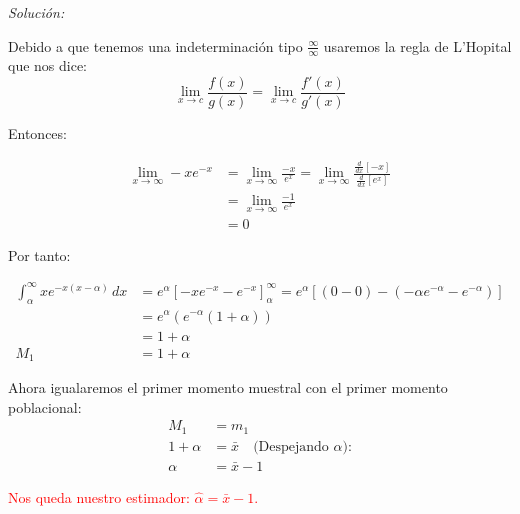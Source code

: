 \documentclass[12pt]{article}
\newenvironment{sol}
    {\emph{Solución:}
    }
    {
    }
\begin{document}
\begin{sol}
\begin{itemize}
Debido a que tenemos una indeterminación tipo $\frac{\infty}{\infty}$ usaremos la regla de L'Hopital que nos dice:\\


\[
\lim_{x \to c} \frac{f(x)}{g(x)} = \lim_{x \to c} \frac{f'(x)}{g'(x)}
\]

Entonces:

\begin{align*}
\lim_{x \to \infty} -xe^{-x} &= \lim_{x \to \infty} \frac{-x}{e^{x}} = \lim_{x \to \infty} \frac{\frac{d}{dx}\left[-x \right]}{\frac{d}{dx}\left[e^{x}\right]} \\
 &=  \lim_{x \to \infty} \frac{-1}{e^{x}} \\
 &= 0
\end{align*}

Por tanto:

\begin{align*}
\int_{\alpha}^{\infty} xe^{-x(x-\alpha)} \, dx &= e^\alpha \left[ -xe^{-x}-e^{-x} \right]_\alpha^\infty = e^\alpha \left[ (0-0)-(-\alpha e^{-\alpha} - e^{-\alpha}) \right] \\
&= e^\alpha(e^{-\alpha} (1+\alpha)) \\
&= 1+\alpha \\
M_1 &= 1+\alpha
\end{align*}
\end{itemize}

Ahora igualaremos el primer momento muestral con el primer momento poblacional:
\begin{align*}
M_1 &= m_1 \\ 
1 + \alpha &= \bar{x} \quad \text{(Despejando }\alpha\text{):} \\ 
\alpha &= \bar{x} - 1 
\end{align*}

\textcolor{red}{%
    Nos queda nuestro estimador: 
    \begin{math}
        \hat{\alpha} = \bar{x} - 1
    \end{math}.
}

\pagebreak
\end{sol}
\end{document}
